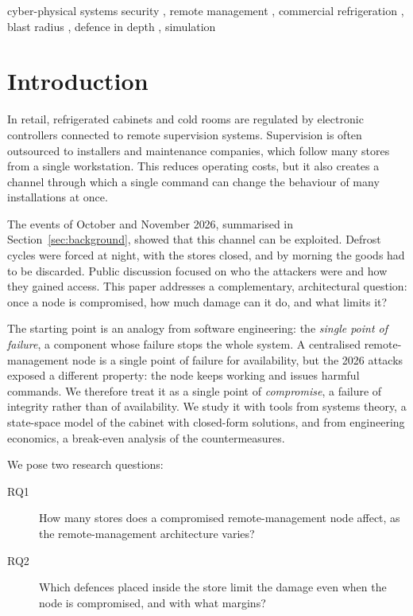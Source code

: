 \documentclass{ceurart}
\begin{document}
\begin{keywords}
  cyber-physical systems security \sep
  remote management \sep
  commercial refrigeration \sep
  blast radius \sep
  defence in depth \sep
  simulation
\end{keywords}

\maketitle

\section{Introduction}

In retail, refrigerated cabinets and cold rooms are regulated by electronic controllers connected to remote supervision systems.
Supervision is often outsourced to installers and maintenance companies, which follow many stores from a single workstation.
This reduces operating costs, but it also creates a channel through which a single command can change the behaviour of many installations at once.

The events of October and November 2026, summarised in Section~\ref{sec:background}, showed that this channel can be exploited.
Defrost cycles were forced at night, with the stores closed, and by morning the goods had to be discarded.
Public discussion focused on who the attackers were and how they gained access.
This paper addresses a complementary, architectural question: once a node is compromised, how much damage can it do, and what limits it?

The starting point is an analogy from software engineering: the \emph{single point of failure}, a component whose failure stops the whole system.
A centralised remote-management node is a single point of failure for availability, but the 2026 attacks exposed a different property: the node keeps working and issues harmful commands.
We therefore treat it as a single point of \emph{compromise}, a failure of integrity rather than of availability.
We study it with tools from systems theory, a state-space model of the cabinet with closed-form solutions, and from engineering economics, a break-even analysis of the countermeasures.

We pose two research questions:
\begin{description}
  \item[RQ1] How many stores does a compromised remote-management node affect, as the remote-management architecture varies?
  \item[RQ2] Which defences placed inside the store limit the damage even when the node is compromised, and with what margins?
\end{description}
\end{document}
